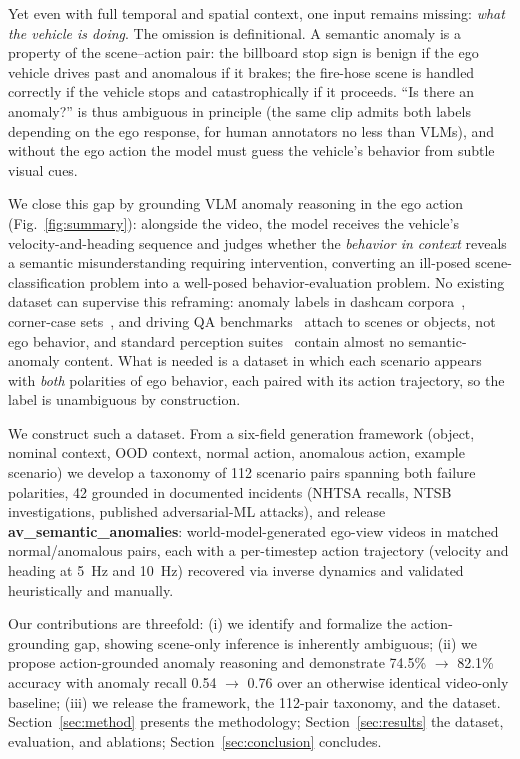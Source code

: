 \documentclass[conference]{IEEEtran}
\begin{document}
Yet even with full temporal and spatial context, one input remains missing: \emph{what the vehicle is doing}. The omission is definitional. A semantic anomaly is a property of the scene--action pair: the billboard stop sign is benign if the ego vehicle drives past and anomalous if it brakes; the fire-hose scene is handled correctly if the vehicle stops and catastrophically if it proceeds. ``Is there an anomaly?'' is thus ambiguous in principle (the same clip admits both labels depending on the ego response, for human annotators no less than VLMs), and without the ego action the model must guess the vehicle's behavior from subtle visual cues.

We close this gap by grounding VLM anomaly reasoning in the ego action (Fig.~\ref{fig:summary}): alongside the video, the model receives the vehicle's velocity-and-heading sequence and judges whether the \emph{behavior in context} reveals a semantic misunderstanding requiring intervention, converting an ill-posed scene-classification problem into a well-posed behavior-evaluation problem. No existing dataset can supervise this reframing: anomaly labels in dashcam corpora~\cite{b7}, corner-case sets~\cite{b5}, and driving QA benchmarks~\cite{b16,b17} attach to scenes or objects, not ego behavior, and standard perception suites~\cite{b14} contain almost no semantic-anomaly content. What is needed is a dataset in which each scenario appears with \emph{both} polarities of ego behavior, each paired with its action trajectory, so the label is unambiguous by construction.

We construct such a dataset. From a six-field generation framework (object, nominal context, OOD context, normal action, anomalous action, example scenario) we develop a taxonomy of 112 scenario pairs spanning both failure polarities, 42 grounded in documented incidents (NHTSA recalls, NTSB investigations, published adversarial-ML attacks), and release \textbf{av\_semantic\_anomalies}: world-model-generated ego-view videos in matched normal/anomalous pairs, each with a per-timestep action trajectory (velocity and heading at 5~Hz and 10~Hz) recovered via inverse dynamics and validated heuristically and manually.

Our contributions are threefold: (i) we identify and formalize the action-grounding gap, showing scene-only inference is inherently ambiguous; (ii) we propose action-grounded anomaly reasoning and demonstrate 74.5\% $\rightarrow$ 82.1\% accuracy with anomaly recall 0.54 $\rightarrow$ 0.76 over an otherwise identical video-only baseline; (iii) we release the framework, the 112-pair taxonomy, and the dataset. Section~\ref{sec:method} presents the methodology; Section~\ref{sec:results} the dataset, evaluation, and ablations; Section~\ref{sec:conclusion} concludes.
\end{document}
